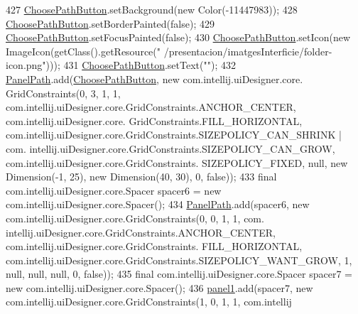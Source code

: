 \begin{DoxyCode}
427         \hyperlink{classpresentacion_1_1form_1_1mainForm_a0f7073c8a28d814154d208bc924fedb4}{ChoosePathButton}.setBackground(\textcolor{keyword}{new} Color(-11447983));
428         \hyperlink{classpresentacion_1_1form_1_1mainForm_a0f7073c8a28d814154d208bc924fedb4}{ChoosePathButton}.setBorderPainted(\textcolor{keyword}{false});
429         \hyperlink{classpresentacion_1_1form_1_1mainForm_a0f7073c8a28d814154d208bc924fedb4}{ChoosePathButton}.setFocusPainted(\textcolor{keyword}{false});
430         \hyperlink{classpresentacion_1_1form_1_1mainForm_a0f7073c8a28d814154d208bc924fedb4}{ChoosePathButton}.setIcon(\textcolor{keyword}{new} ImageIcon(getClass().getResource(\textcolor{stringliteral}{"
      /presentacion/imatgesInterficie/folder-icon.png"})));
431         \hyperlink{classpresentacion_1_1form_1_1mainForm_a0f7073c8a28d814154d208bc924fedb4}{ChoosePathButton}.setText(\textcolor{stringliteral}{""});
432         \hyperlink{classpresentacion_1_1form_1_1mainForm_a0704eebe3c2e55cfd3b9344cca4d2d4b}{PanelPath}.add(\hyperlink{classpresentacion_1_1form_1_1mainForm_a0f7073c8a28d814154d208bc924fedb4}{ChoosePathButton}, \textcolor{keyword}{new} com.intellij.uiDesigner.core.
      GridConstraints(0, 3, 1, 1, com.intellij.uiDesigner.core.GridConstraints.ANCHOR\_CENTER, com.intellij.uiDesigner.core.
      GridConstraints.FILL\_HORIZONTAL, com.intellij.uiDesigner.core.GridConstraints.SIZEPOLICY\_CAN\_SHRINK | com.
      intellij.uiDesigner.core.GridConstraints.SIZEPOLICY\_CAN\_GROW, com.intellij.uiDesigner.core.GridConstraints.
      SIZEPOLICY\_FIXED, null, \textcolor{keyword}{new} Dimension(-1, 25), \textcolor{keyword}{new} Dimension(40, 30), 0, \textcolor{keyword}{false}));
433         \textcolor{keyword}{final} com.intellij.uiDesigner.core.Spacer spacer6 = \textcolor{keyword}{new} com.intellij.uiDesigner.core.Spacer();
434         \hyperlink{classpresentacion_1_1form_1_1mainForm_a0704eebe3c2e55cfd3b9344cca4d2d4b}{PanelPath}.add(spacer6, \textcolor{keyword}{new} com.intellij.uiDesigner.core.GridConstraints(0, 0, 1, 1, com.
      intellij.uiDesigner.core.GridConstraints.ANCHOR\_CENTER, com.intellij.uiDesigner.core.GridConstraints.
      FILL\_HORIZONTAL, com.intellij.uiDesigner.core.GridConstraints.SIZEPOLICY\_WANT\_GROW, 1, null, null, null, 0, \textcolor{keyword}{false}));
435         \textcolor{keyword}{final} com.intellij.uiDesigner.core.Spacer spacer7 = \textcolor{keyword}{new} com.intellij.uiDesigner.core.Spacer();
436         \hyperlink{classpresentacion_1_1form_1_1mainForm_aa43e009cc6dc09d4e637385fbd361510}{panel1}.add(spacer7, \textcolor{keyword}{new} com.intellij.uiDesigner.core.GridConstraints(1, 0, 1, 1, com.intellij

\end{DoxyCode}
